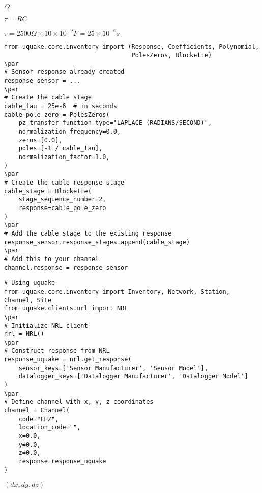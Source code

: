 \documentclass[12pt]{article}
\def\lthtmlcheckvsize{\ifdim\ht\sizebox<\vsize 
  \ifdim\wd\sizebox<\hsize\expandafter\hfill\fi \expandafter\vfill
  \else\expandafter\vss\fi}%
\begin{document}
{\newpage\clearpage
{}%
$\Omega$%
\lthtmlindisplaymathZ
\lthtmlcheckvsize\clearpage}

{\newpage\clearpage
{}%
\(\tau = RC\)%
\lthtmlindisplaymathZ
\lthtmlcheckvsize\clearpage}

{\newpage\clearpage
{}%
$\displaystyle \tau = 2500 \Omega \times 10 \times 10^{-9} F = 25 \times 10^{-6} s
$%
\lthtmlindisplaymathZ
\lthtmlcheckvsize\clearpage}

{\newpage\clearpage
{}%
\begin{verbatim}
from uquake.core.inventory import (Response, Coefficients, Polynomial, 
                                   PolesZeros, Blockette)
\par
# Sensor response already created
response_sensor = ...
\par
# Create the cable stage
cable_tau = 25e-6  # in seconds
cable_pole_zero = PolesZeros(
    pz_transfer_function_type="LAPLACE (RADIANS/SECOND)",
    normalization_frequency=0.0,
    zeros=[0.0],
    poles=[-1 / cable_tau],
    normalization_factor=1.0,
)
\par
# Create the cable response stage
cable_stage = Blockette(
    stage_sequence_number=2,
    response=cable_pole_zero
)
\par
# Add the cable stage to the existing response
response_sensor.response_stages.append(cable_stage)
\par
# Add this to your channel
channel.response = response_sensor
\end{verbatim}%
\lthtmlfigureZ
\lthtmlcheckvsize\clearpage}

{\newpage\clearpage
{}%
\begin{verbatim}
# Using uquake
from uquake.core.inventory import Inventory, Network, Station, Channel, Site
from uquake.clients.nrl import NRL
\par
# Initialize NRL client
nrl = NRL()
\par
# Construct response from NRL
response_uquake = nrl.get_response(
    sensor_keys=['Sensor Manufacturer', 'Sensor Model'],
    datalogger_keys=['Datalogger Manufacturer', 'Datalogger Model']
)
\par
# Define channel with x, y, z coordinates
channel = Channel(
    code="EHZ",
    location_code="",
    x=0.0,
    y=0.0,
    z=0.0,
    response=response_uquake
)
\end{verbatim}%
\lthtmlfigureZ
\lthtmlcheckvsize\clearpage}

{\newpage\clearpage
{}%
\((dx, dy, dz)\)%
\lthtmlindisplaymathZ
\lthtmlcheckvsize\clearpage}

\end{document}

